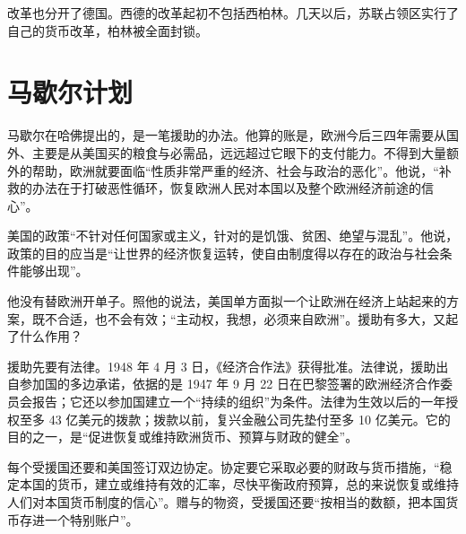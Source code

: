 改革也分开了德国。西德的改革起初不包括西柏林。几天以后，苏联占领区实行了自己的货币改革，柏林被全面封锁\cite{buchheim1988}。


\section{马歇尔计划}\label{sec:reconstruction-marshall}

马歇尔在哈佛提出的，是一笔援助的办法。他算的账是，欧洲今后三四年需要从国外、主要是从美国买的粮食与必需品，远远超过它眼下的支付能力\cite{marshall1947}。不得到大量额外的帮助，欧洲就要面临“性质非常严重的经济、社会与政治的恶化”\cite{marshall1947}。他说，“补救的办法在于打破恶性循环，恢复欧洲人民对本国以及整个欧洲经济前途的信心”\cite{marshall1947}。

美国的政策“不针对任何国家或主义，针对的是饥饿、贫困、绝望与混乱”\cite{marshall1947}。他说，政策的目的应当是“让世界的经济恢复运转，使自由制度得以存在的政治与社会条件能够出现”\cite{marshall1947}。

他没有替欧洲开单子。照他的说法，美国单方面拟一个让欧洲在经济上站起来的方案，既不合适，也不会有效；“主动权，我想，必须来自欧洲”\cite{marshall1947}。援助有多大，又起了什么作用？

援助先要有法律。1948 年 4 月 3 日，《经济合作法》获得批准\cite{eca1948}。法律说，援助出自参加国的多边承诺，依据的是 1947 年 9 月 22 日在巴黎签署的欧洲经济合作委员会报告；它还以参加国建立一个“持续的组织”为条件\cite{eca1948}。法律为生效以后的一年授权至多 43 亿美元的拨款；拨款以前，复兴金融公司先垫付至多 10 亿美元\cite{eca1948}。它的目的之一，是“促进恢复或维持欧洲货币、预算与财政的健全”\cite{eca1948}。

每个受援国还要和美国签订双边协定\cite{eca1948}。协定要它采取必要的财政与货币措施，“稳定本国的货币，建立或维持有效的汇率，尽快平衡政府预算，总的来说恢复或维持人们对本国货币制度的信心”\cite{eca1948}。赠与的物资，受援国还要“按相当的数额，把本国货币存进一个特别账户”\cite{eca1948}。

